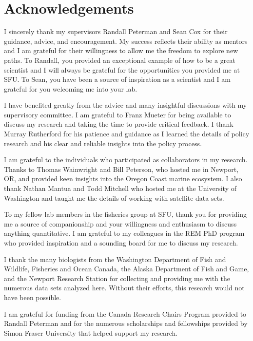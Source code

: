 

\chapter*{Acknowledgements}

I sincerely thank my supervisors Randall Peterman and Sean Cox for their
guidance, advice, and encouragement. My success reflects their ability as
mentors and I am grateful for their willingness to allow me the freedom to
explore new paths. To Randall, you provided an exceptional example of how to be
a great scientist and I will always be grateful for the opportunities you
provided me at SFU. To Sean, you have been a source of inspiration as a
scientist and I am grateful for you welcoming me into your lab.

I have benefited greatly from the advice and many insightful discussions with my
supervisory committee. I am grateful to Franz Mueter for being available to
discuss my research and taking the time to provide critical feedback. I thank
Murray Rutherford for his patience and guidance as I learned the details of
policy research and his clear and reliable insights into the policy process.

I am grateful to the individuals who participated as collaborators in my
research. Thanks to Thomas Wainwright and Bill Peterson, who hosted me in
Newport, OR, and provided keen insights into the Oregon Coast marine ecosystem.
I also thank Nathan Mantua and Todd Mitchell who hosted me at the University of
Washington and taught me the details of working with satellite data sets.

To my fellow lab members in the fisheries group at SFU, thank you for providing
me a source of companionship and your willingness and enthusiasm to discuss
anything quantitative. I am grateful to my colleagues in the REM PhD program who
provided inspiration and a sounding board for me to discuss my research.

I thank the many biologists from the Washington Department of Fish and Wildlife,
Fisheries and Ocean Canada, the Alaska Department of Fish and Game, and the
Newport Research Station for collecting and providing me with the numerous data
sets analyzed here. Without their efforts, this research would not have been
possible.

I am grateful for funding from the Canada Research Chairs Program provided to
Randall Peterman and for the numerous scholarships and fellowships provided by
Simon Fraser University that helped support my research.

